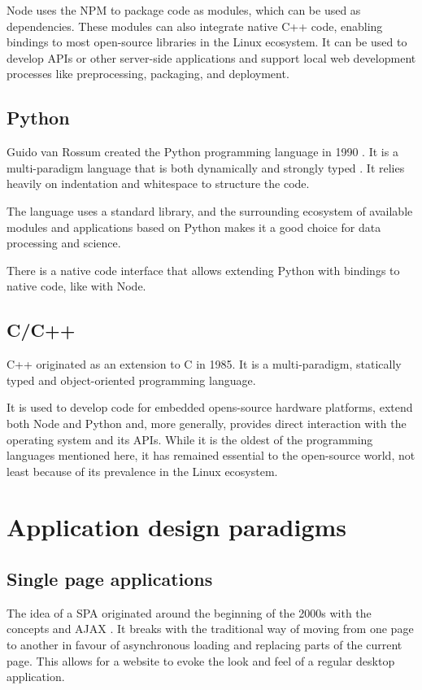 Node uses the \ac{NPM} to package code as modules, which can be used as dependencies. These modules can also integrate native C++ code, enabling bindings to most open-source libraries in the Linux ecosystem. It can be used to develop \ac{API}s or other server-side applications and support local web development processes like preprocessing, packaging, and deployment.

\subsection{Python}

Guido van Rossum created the Python programming language in 1990 \parencite{pythonHistory}. It is a multi-paradigm language that is both dynamically and strongly typed \parencite{pythonTyping}. It relies heavily on indentation and whitespace to structure the code.

The language uses a standard library, and the surrounding ecosystem of available modules and applications based on Python makes it a good choice for data processing and science.

There is a native code interface that allows extending Python with bindings to native code, like with Node.

\subsection{C/C++}

C++ originated as an extension to C in 1985. It is a multi-paradigm, statically typed and object-oriented programming language.

It is used to develop code for embedded opens-source hardware platforms, extend both Node and Python and, more generally, provides direct interaction with the operating system and its APIs. While it is the oldest of the programming languages mentioned here, it has remained essential to the open-source world, not least because of its prevalence in the Linux ecosystem.


\section{Application design paradigms}

\subsection{Single page applications}

The idea of a \ac{SPA} originated around the beginning of the 2000s with the concepts  \parencite{innerBrowsing} and \ac{AJAX} \parencite{ajaxNewApproach}. It breaks with the traditional way of moving from one page to another in favour of asynchronous loading and replacing parts of the current page. This allows for a website to evoke the look and feel of a regular desktop application.

